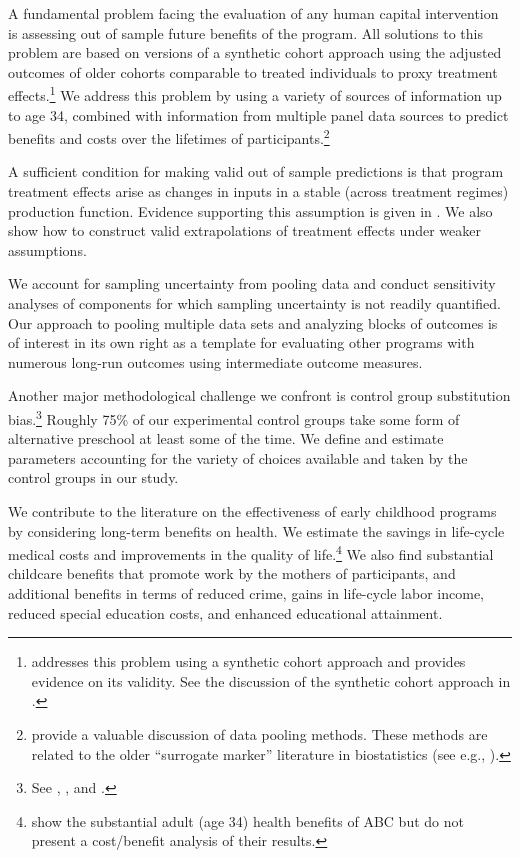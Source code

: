 A fundamental problem facing the evaluation of any human capital intervention is assessing out of sample future benefits of the program. All solutions to this problem are based on versions of a synthetic cohort approach using the adjusted outcomes of older cohorts comparable to treated individuals to proxy treatment effects.\footnote{\cite{Mincer_1974_schooling} addresses this problem using a synthetic cohort approach and provides evidence on its validity. See the discussion of the synthetic cohort approach in \cite{Heckman_Lochner_ea_2006_HEE}.} We address this problem by using a variety of sources of information up to age 34, combined with information from multiple panel data sources to predict benefits and costs over the lifetimes of participants.\footnote{\citet{Ridder_Moffitt_2007_hbk_metricsdata} provide a valuable discussion of data pooling methods. These methods are related to the older ``surrogate marker'' literature in biostatistics (see e.g., \citealp{Prentice_1989_Surrogate_SiM}).}

A sufficient condition for making valid out of sample predictions is that program treatment effects arise as changes in inputs in a stable (across treatment regimes) production function. Evidence supporting this assumption is given in \citet{Heckman_Pinto_etal_2013_PerryFactor}. We also show how to construct valid extrapolations of treatment effects under weaker assumptions.

We account for sampling uncertainty from pooling data and conduct sensitivity analyses of components for which sampling uncertainty is not readily quantified. Our approach to pooling multiple data sets and analyzing blocks of outcomes is of interest in its own right as a template for evaluating other programs with numerous long-run outcomes using intermediate outcome measures.

Another major methodological challenge we confront is control group substitution bias.\footnote{See \cite{Heckman_1992_randomization}, \cite{Heckman_Hohmann_etal_2000_QJE}, and \cite{Kline_Walters_2016_QJE}.} Roughly 75\% of our experimental control groups take some form of alternative preschool at least some of the time. We define and estimate parameters accounting for the variety of choices available and taken by the control groups in our study.

We contribute to the literature on the effectiveness of early childhood programs by considering long-term benefits on health. We estimate the savings in life-cycle medical costs and improvements in the quality of life.\footnote{\cite{Campbell_Conti_etal_2014_EarlyChildhoodInvestments} show the substantial adult (age 34) health benefits of ABC but do not present a cost/benefit analysis of their results.} We also find substantial childcare benefits that promote work by the mothers of participants, and additional benefits in terms of reduced crime, gains in life-cycle labor income, reduced special education costs, and enhanced educational attainment.

